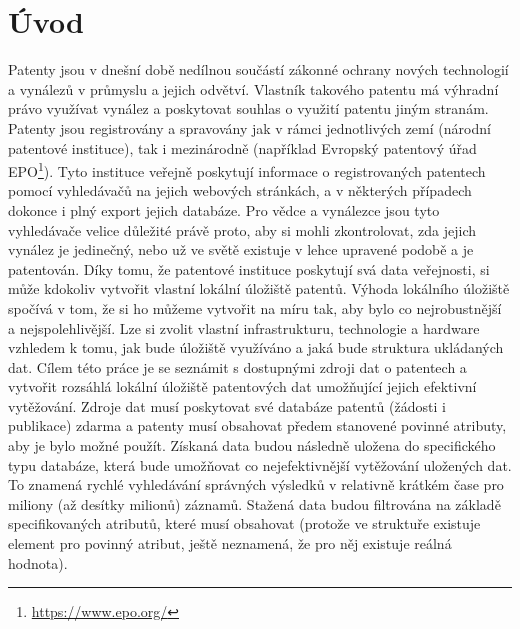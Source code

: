 \chapter{Úvod}
Patenty jsou v dnešní době nedílnou součástí zákonné ochrany nových technologií a vynálezů v průmyslu a jejich odvětví. Vlastník takového patentu má výhradní právo využívat vynález a poskytovat souhlas o využití patentu jiným stranám. Patenty jsou registrovány a spravovány jak v rámci jednotlivých zemí (národní patentové instituce), tak i mezinárodně (například Evropský patentový úřad \gls{EPO}\footnote{\href{https://www.epo.org/}{https://www.epo.org/}}). Tyto instituce veřejně poskytují informace o registrovaných patentech pomocí vyhledávačů na jejich webových stránkách, a v některých případech dokonce i plný export jejich databáze. Pro vědce a vynálezce jsou tyto vyhledávače velice důležité právě proto, aby si mohli zkontrolovat, zda jejich vynález je jedinečný, nebo už ve světě existuje v lehce upravené podobě a je patentován.
\newline
\indent Díky tomu, že patentové instituce poskytují svá data veřejnosti, si může kdokoliv vytvořit vlastní lokální úložiště patentů. Výhoda lokálního úložiště spočívá v tom, že si ho můžeme vytvořit na míru tak, aby bylo co nejrobustnější a nejspolehlivější. Lze si zvolit vlastní infrastrukturu, technologie a hardware vzhledem k tomu, jak bude úložiště využíváno a jaká bude struktura ukládaných dat.
\newline
\indent Cílem této práce je se seznámit s dostupnými zdroji dat o patentech a vytvořit rozsáhlá lokální úložiště patentových dat umožňující jejich efektivní vytěžování. Zdroje dat musí poskytovat své databáze patentů (žádosti i publikace) zdarma a patenty musí obsahovat předem stanovené povinné atributy, aby je bylo možné použít. Získaná data budou následně uložena do specifického typu databáze, která bude umožňovat co nejefektivnější vytěžování uložených dat. To znamená rychlé vyhledávání správných výsledků v relativně krátkém čase pro miliony (až desítky milionů) záznamů. Stažená data budou filtrována na základě specifikovaných atributů, které musí obsahovat (protože ve struktuře existuje element pro povinný atribut, ještě neznamená, že pro něj existuje reálná hodnota).